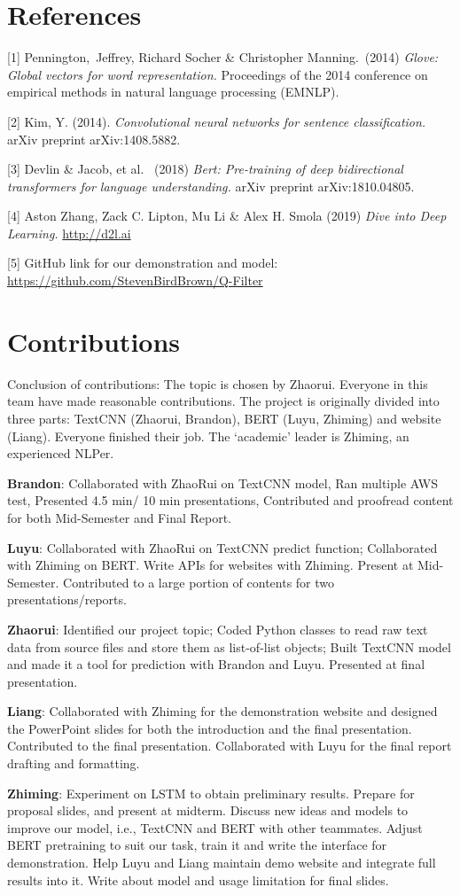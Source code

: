 \documentclass{article}
\begin{document}
\section*{References}

\small

[1] Pennington,\ Jeffrey, Richard Socher \& Christopher Manning.\ (2014) {\it Glove: Global vectors for word representation.} Proceedings of the 2014 conference on empirical methods in natural language processing (EMNLP).

[2] Kim, Y. (2014). {\it Convolutional neural networks for sentence classification.} arXiv preprint arXiv:1408.5882.

[3] Devlin \& Jacob, et al. \ (2018) {\it Bert: Pre-training of deep bidirectional transformers for language understanding.} arXiv preprint arXiv:1810.04805.

[4] Aston Zhang, Zack C. Lipton, Mu Li \& Alex H. Smola (2019) {\it Dive into Deep Learning. } \url{http://d2l.ai}

[5] GitHub link for our demonstration and model: \url{https://github.com/StevenBirdBrown/Q-Filter} 

\section*{Contributions}
Conclusion of contributions: The topic is chosen by Zhaorui. Everyone in this team have made reasonable contributions. The project is originally divided into three parts: TextCNN (Zhaorui, Brandon), BERT (Luyu, Zhiming) and website (Liang). Everyone finished their job. The ‘academic’ leader is Zhiming, an experienced NLPer. 

\textbf{Brandon}: Collaborated with ZhaoRui on TextCNN model, Ran multiple AWS test, Presented 4.5 min/ 10 min presentations, Contributed and proofread content for both Mid-Semester and Final Report.  

\textbf{Luyu}: Collaborated with ZhaoRui on TextCNN predict function; Collaborated with Zhiming on BERT. Write APIs for websites with Zhiming. Present at Mid-Semester. Contributed to a large portion of contents for two presentations/reports.

\textbf{Zhaorui}: Identified our project topic; Coded Python classes to read raw text data from source files and store them as list-of-list objects; Built TextCNN model and made it a tool for prediction with Brandon and Luyu. Presented at final presentation. 

\textbf{Liang}: Collaborated with Zhiming for the demonstration website and designed the PowerPoint slides for both the introduction and the final presentation. Contributed to the final presentation. Collaborated with Luyu for the final report drafting and formatting. 

\textbf{Zhiming}: Experiment on LSTM to obtain preliminary results. Prepare for proposal slides, and present at midterm. Discuss new ideas and models to improve our model, i.e., TextCNN and BERT with other teammates. Adjust BERT pretraining to suit our task, train it and write the interface for demonstration. Help Luyu and Liang maintain demo website and integrate full results into it. Write about model and usage limitation for final slides. %
\end{document}
